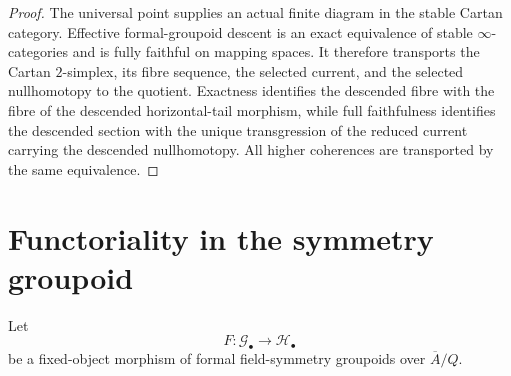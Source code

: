 \begin{proof}
The universal point supplies an actual finite diagram in the stable Cartan
category.  Effective formal-groupoid descent is an exact equivalence of stable
$\infty$-categories and is fully faithful on mapping spaces.  It therefore
transports the Cartan $2$-simplex, its fibre sequence, the selected current, and the
selected nullhomotopy to the quotient.  Exactness identifies the descended fibre
with the fibre of the descended horizontal-tail morphism, while full faithfulness
identifies the descended section with the unique transgression of the reduced
current carrying the descended nullhomotopy.  All higher coherences are transported
by the same equivalence.
\end{proof}

\section{Functoriality in the symmetry groupoid}
\label{sec:symmetry-noether-functoriality-in-the-symmetry-groupoid}

Let
\[
F:\mathcal G_\bullet\longrightarrow\mathcal H_\bullet
\]
be a fixed-object morphism of formal field-symmetry groupoids over
$\overline A/Q$.

